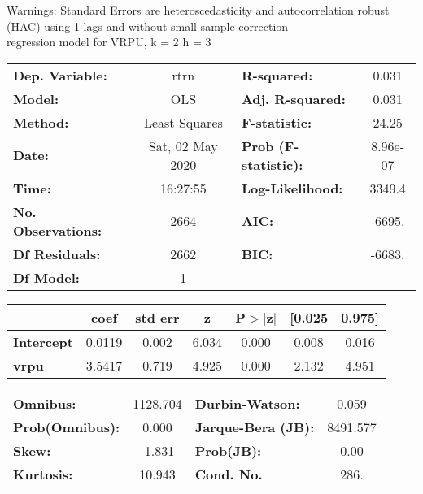 Warnings: \newline
 [1] Standard Errors are heteroscedasticity and autocorrelation robust (HAC) using 1 lags and without small sample correction\\ 

regression model for VRPU, k = 2 h = 3\begin{center}
\begin{tabular}{lclc}
\toprule
\textbf{Dep. Variable:}    &       rtrn       & \textbf{  R-squared:         } &     0.031   \\
\textbf{Model:}            &       OLS        & \textbf{  Adj. R-squared:    } &     0.031   \\
\textbf{Method:}           &  Least Squares   & \textbf{  F-statistic:       } &     24.25   \\
\textbf{Date:}             & Sat, 02 May 2020 & \textbf{  Prob (F-statistic):} &  8.96e-07   \\
\textbf{Time:}             &     16:27:55     & \textbf{  Log-Likelihood:    } &    3349.4   \\
\textbf{No. Observations:} &        2664      & \textbf{  AIC:               } &    -6695.   \\
\textbf{Df Residuals:}     &        2662      & \textbf{  BIC:               } &    -6683.   \\
\textbf{Df Model:}         &           1      & \textbf{                     } &             \\
\bottomrule
\end{tabular}
\begin{tabular}{lcccccc}
                   & \textbf{coef} & \textbf{std err} & \textbf{z} & \textbf{P$> |$z$|$} & \textbf{[0.025} & \textbf{0.975]}  \\
\midrule
\textbf{Intercept} &       0.0119  &        0.002     &     6.034  &         0.000        &        0.008    &        0.016     \\
\textbf{vrpu}      &       3.5417  &        0.719     &     4.925  &         0.000        &        2.132    &        4.951     \\
\bottomrule
\end{tabular}
\begin{tabular}{lclc}
\textbf{Omnibus:}       & 1128.704 & \textbf{  Durbin-Watson:     } &    0.059  \\
\textbf{Prob(Omnibus):} &   0.000  & \textbf{  Jarque-Bera (JB):  } & 8491.577  \\
\textbf{Skew:}          &  -1.831  & \textbf{  Prob(JB):          } &     0.00  \\
\textbf{Kurtosis:}      &  10.943  & \textbf{  Cond. No.          } &     286.  \\
\bottomrule
\end{tabular}
\end{center}

